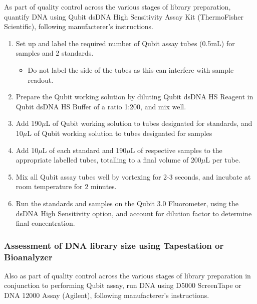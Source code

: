 \label{Isoseq_Protocol_qubit}
As part of quality control across the various stages of library preparation, quantify DNA using Qubit dsDNA High Sensitivity Assay Kit (ThermoFisher Scientific), following manufacterer's instructions.  	
\begin{enumerate}
	\item Set up and label the required number of Qubit assay tubes (0.5mL) for samples and 2 standards. 
	\begin{itemize}
		\item Do not label the side of the tubes as this can interfere with sample readout. 
	\end{itemize} 
	\item Prepare the Qubit working solution by diluting Qubit dsDNA HS Reagent in Qubit dsDNA HS Buffer of a ratio 1:200, and mix well. 
	\item Add 190$\mu$L of Qubit working solution to tubes designated for standards, and 10$\mu$L of Qubit working solution to tubes designated for samples 
	\item Add 10$\mu$L of each standard and 190$\mu$L of respective samples to the appropriate labelled tubes, totalling to a final volume of 200$\mu$L per tube.
	\item Mix all Qubit assay tubes well by vortexing for 2-3 seconds, and incubate at room temperature for 2 minutes. 
	\item Run the standards and samples on the Qubit 3.0 Fluorometer, using the dsDNA High Sensitivity option, and account for dilution factor to determine final concentration. 
\end{enumerate}

\subsubsection{Assessment of DNA library size using Tapestation or Bioanalyzer}
\label{Isoseq_Protocol_tapestation_bioanalyzer}
Also as part of quality control across the various stages of library preparation in conjunction to performing Qubit assay, run DNA using D5000 ScreenTape or DNA 12000 Assay (Agilent), following manufacterer's instructions. 

